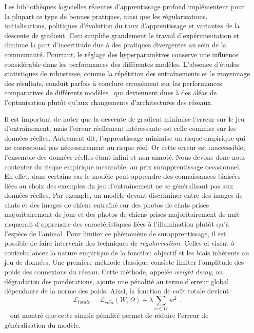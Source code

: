 Les bibliothèques logicielles récentes d'apprentissage profond implémentent pour la plupart ce type de bonnes pratiques, ainsi que les régularisations, initialisations, politiques d'évolution du taux d'apprentissage et variantes de la descente de gradient. Ceci simplifie grandement le travail d'expérimentation et diminue la part d'incertitude due à des pratiques divergentes au sein de la communauté. Pourtant, le réglage des hyperparamètres conserve une influence considérable dans les performances des différentes modèles. L'absence d'études statistiques de robustesse, comme la répétition des entraînements et le moyennage des résultats, conduit parfois à conclure erronément sur les performances comparatives de différents modèles~\cite{oliver_realistic_2018} qui deviennent dues à des aléas de l'optimisation plutôt qu'aux changements d'architectures des réseaux.

Il est important de noter que la descente de gradient minimise l'erreur sur le jeu d'entraînement, mais l'erreur réellement intéressante est celle commise sur les données réelles. Autrement dit, l'apprentissage minimise un risque empirique qui ne correspond pas nécessairement au risque réel. Or cette erreur est inaccessible, l'ensemble des données réelles étant infini et non-annoté. Nous devons donc nous contenter du risque empirique mesurable, au prix surapprentissage occasionnel. En effet, dans certains cas le modèle peut apprendre des connaissances biaisées liées au choix des exemples du jeu d'entraînement ne se généralisant pas aux données réelles. Par exemple, un modèle devant discriminer entre des images de chats et des images de chiens entraîné sur des photos de chats prises majoritairement de jour et des photos de chiens prises majoritairement de nuit risquerait d'apprendre des caractéristiques liées à l'illumination plutôt qu'à l'espèce de l'animal.
Pour limiter ce phénomène de surapprentissage, il est possible de faire intervenir des techniques de \emph{régularisation}. Celles-ci visent à contrebalancer la nature empirique de la fonction objectif et les biais inhérents au jeu de données. Une première méthode classique consiste limiter l'amplitude des poids des connexions du réseau. Cette méthode, appelée \emph{weight decay}, ou dégradation des pondérations, ajoute une pénalité au terme d'erreur global dépendante de la norme des poids. Ainsi, la fonction de coût totale devient\,:
$$\mathcal{L}_{totale} = \mathcal{L}_{co\hat{u}t}(W, \Omega) + \lambda \sum_{w \in W} w^2~~.$$
~\citet{krogh_simple_1991} ont montré que cette simple pénalité permet de réduire l'erreur de généralisation du modèle.

